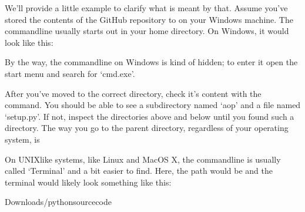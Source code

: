 \documentclass[letterpaper,10pt,english]{sphinxmanual}
\begin{document}
\sphinxAtStartPar
We’ll provide a little example to clarify what is meant by that. Assume you’ve
stored the contents of the GitHub repository to
 on your Windows machine. The
command\sphinxhyphen{}line usually starts out in your home directory. On Windows, it would
look like this:

\begin{sphinxVerbatim}[commandchars=\\\{\}]
\end{sphinxVerbatim}

\sphinxAtStartPar
By the way, the command\sphinxhyphen{}line on Windows is kind of hidden; to enter it open the
start menu and search for ‘cmd.exe’.

\sphinxAtStartPar
After you’ve moved to the correct directory, check it’s content with the
\sphinxhyphen{}command. You should be able to see a sub\sphinxhyphen{}directory named ‘aop’ and a file
named ‘setup.py’. If not, inspect the directories above and below until you
found such a directory. The way you go to the parent directory, regardless of
your operating system, is

\begin{sphinxVerbatim}[commandchars=\\\{\}]
\end{sphinxVerbatim}

\sphinxAtStartPar
On UNIX\sphinxhyphen{}like systems, like Linux and MacOS X, the command\sphinxhyphen{}line is usually
called ‘Terminal’ and a bit easier to find. Here, the path would be
 and the terminal would likely look
something like this:

\begin{sphinxVerbatim}[commandchars=\\\{\}]
Downloads/python\PYGZus{}source\PYGZus{}code
\end{sphinxVerbatim}
\end{document}
